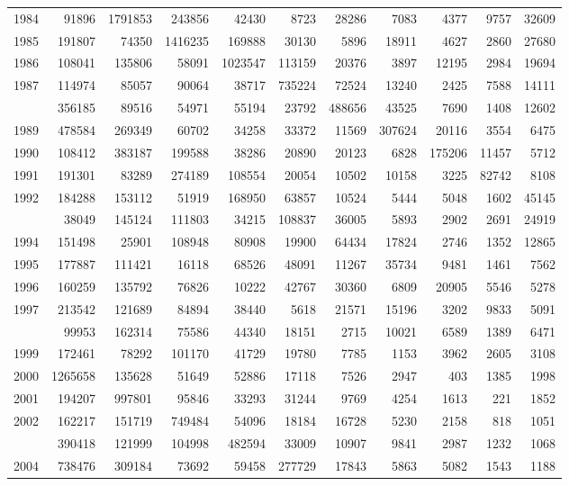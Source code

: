 \documentclass[
]{article}
\begin{document}
\begin{longtable}[t]{lrrrrrrrrrr}
1984 & 91896 & 1791853 & 243856 & 42430 & 8723 & 28286 & 7083 & 4377 & 9757 & 32609\\
1985 & 191807 & 74350 & 1416235 & 169888 & 30130 & 5896 & 18911 & 4627 & 2860 & 27680\\
1986 & 108041 & 135806 & 58091 & 1023547 & 113159 & 20376 & 3897 & 12195 & 2984 & 19694\\
1987 & 114974 & 85057 & 90064 & 38717 & 735224 & 72524 & 13240 & 2425 & 7588 & 14111\\
\addlinespace
1988 & 356185 & 89516 & 54971 & 55194 & 23792 & 488656 & 43525 & 7690 & 1408 & 12602\\
1989 & 478584 & 269349 & 60702 & 34258 & 33372 & 11569 & 307624 & 20116 & 3554 & 6475\\
1990 & 108412 & 383187 & 199588 & 38286 & 20890 & 20123 & 6828 & 175206 & 11457 & 5712\\
1991 & 191301 & 83289 & 274189 & 108554 & 20054 & 10502 & 10158 & 3225 & 82742 & 8108\\
1992 & 184288 & 153112 & 51919 & 168950 & 63857 & 10524 & 5444 & 5048 & 1602 & 45145\\
\addlinespace
1993 & 38049 & 145124 & 111803 & 34215 & 108837 & 36005 & 5893 & 2902 & 2691 & 24919\\
1994 & 151498 & 25901 & 108948 & 80908 & 19900 & 64434 & 17824 & 2746 & 1352 & 12865\\
1995 & 177887 & 111421 & 16118 & 68526 & 48091 & 11267 & 35734 & 9481 & 1461 & 7562\\
1996 & 160259 & 135792 & 76826 & 10222 & 42767 & 30360 & 6809 & 20905 & 5546 & 5278\\
1997 & 213542 & 121689 & 84894 & 38440 & 5618 & 21571 & 15196 & 3202 & 9833 & 5091\\
\addlinespace
1998 & 99953 & 162314 & 75586 & 44340 & 18151 & 2715 & 10021 & 6589 & 1389 & 6471\\
1999 & 172461 & 78292 & 101170 & 41729 & 19780 & 7785 & 1153 & 3962 & 2605 & 3108\\
2000 & 1265658 & 135628 & 51649 & 52886 & 17118 & 7526 & 2947 & 403 & 1385 & 1998\\
2001 & 194207 & 997801 & 95846 & 33293 & 31244 & 9769 & 4254 & 1613 & 221 & 1852\\
2002 & 162217 & 151719 & 749484 & 54096 & 18184 & 16728 & 5230 & 2158 & 818 & 1051\\
\addlinespace
2003 & 390418 & 121999 & 104998 & 482594 & 33009 & 10907 & 9841 & 2987 & 1232 & 1068\\
2004 & 738476 & 309184 & 73692 & 59458 & 277729 & 17843 & 5863 & 5082 & 1543 & 1188\\

\end{longtable}
\end{document}
